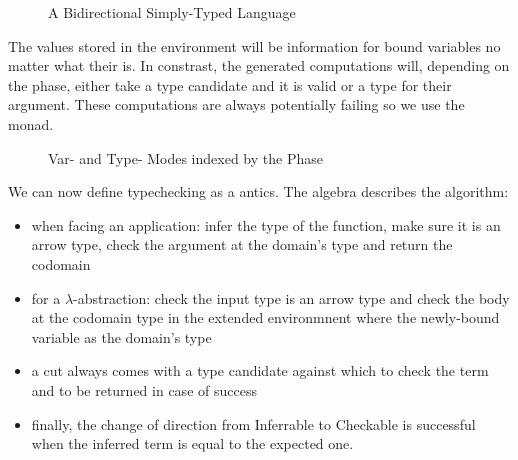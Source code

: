 \begin{figure}[h]
\begin{minipage}{0.35\textwidth}
\end{minipage}
\begin{minipage}{0.55\textwidth}
\end{minipage}
\caption{A Bidirectional Simply-Typed Language}
\end{figure}

The values stored in the environment will be  information for bound
variables no matter what their  is. In constrast, the generated
computations will, depending on the phase, either take a type candidate and
 it is valid or  a type for their argument. These
computations are always potentially failing so we use the  monad.

\begin{figure}[h]
\begin{minipage}{0.40\textwidth}
\end{minipage}
\begin{minipage}{0.50\textwidth}
\end{minipage}
\caption{Var- and Type- Modes indexed by the Phase}
\end{figure}

We can now define typechecking as a antics. The algebra describes the
algorithm:
\begin{itemize}
  \item when facing an application: infer the type of the function, make sure
    it is an arrow type, check the argument at the domain's type and return the
    codomain
  \item for a $\lambda$-abstraction: check the input type is an arrow type and
    check the body at the codomain type in the extended environmnent where the
    newly-bound variable as the domain's type
  \item a cut always comes with a type candidate against which to check the term
    and to be returned in case of success
  \item finally, the change of direction from Inferrable to Checkable is successful
    when the inferred term is equal to the expected one.
\end{itemize}

